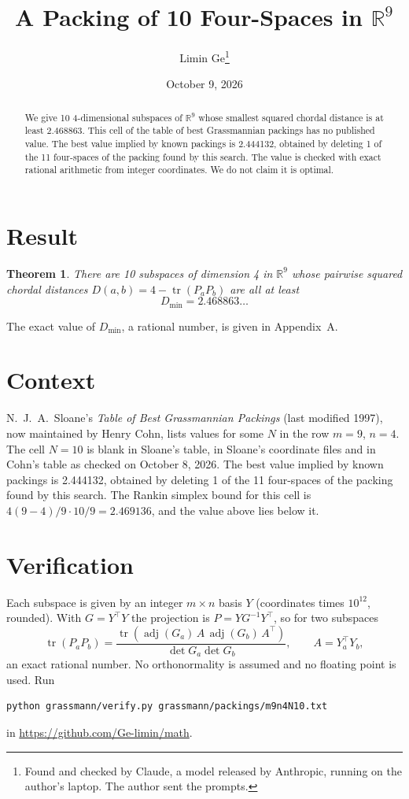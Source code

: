 \documentclass[11pt,a4paper]{article}
\title{A Packing of 10 Four-Spaces in $\mathbb{R}^{9}$}
\author{Limin Ge\thanks{Found and checked by Claude, a model released by Anthropic, running on the author's laptop. The author sent the prompts.}}
\date{October 9, 2026}
\newtheorem*{theorem}{Theorem}
\begin{document}
\maketitle
\begin{abstract}
We give 10 4-dimensional subspaces of $\mathbb{R}^{9}$ whose smallest squared chordal distance is at least 2.468863. This cell of the table of best Grassmannian packings has no published value. The best value implied by known packings is 2.444132, obtained by deleting 1 of the 11 four-spaces of the packing found by this search. The value is checked with exact rational arithmetic from integer coordinates. We do not claim it is optimal.
\end{abstract}

\section{Result}
\begin{theorem}
There are 10 subspaces of dimension 4 in $\mathbb{R}^{9}$ whose pairwise squared chordal distances $D(a,b) = 4 - \operatorname{tr}(P_aP_b)$ are all at least
\[ D_{\min} = 2.468863\ldots \]
\end{theorem}
The exact value of $D_{\min}$, a rational number, is given in Appendix~A.


\section{Context}
N.~J.~A.~Sloane's \emph{Table of Best Grassmannian Packings} (last modified 1997), now maintained by Henry Cohn, lists values for some $N$ in the row $m=9$, $n=4$. The cell $N=10$ is blank in Sloane's table, in Sloane's coordinate files and in Cohn's table as checked on October 8, 2026. The best value implied by known packings is 2.444132, obtained by deleting 1 of the 11 four-spaces of the packing found by this search. The Rankin simplex bound for this cell is $4(9-4)/9\cdot 10/9 = 2.469136$, and the value above lies below it.


\section{Verification}
Each subspace is given by an integer $m\times n$ basis $Y$ (coordinates times $10^{12}$, rounded). With $G=Y^\top Y$ the projection is $P=YG^{-1}Y^\top$, so for two subspaces
\[ \operatorname{tr}(P_aP_b)=\frac{\operatorname{tr}(\operatorname{adj}(G_a)\,A\,\operatorname{adj}(G_b)\,A^\top)}{\det G_a\det G_b},\qquad A=Y_a^\top Y_b, \]
an exact rational number. No orthonormality is assumed and no floating point is used. Run
\begin{verbatim}
python grassmann/verify.py grassmann/packings/m9n4N10.txt
\end{verbatim}
in \url{https://github.com/Ge-limin/math}.
\end{document}
